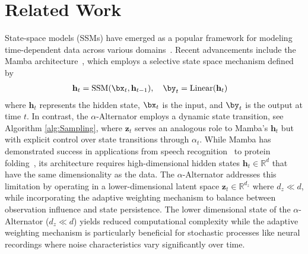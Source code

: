 \section{Related Work}
\label{sec:related}

 State-space models (SSMs) have emerged as a popular framework for modeling time-dependent data across various domains~\citep{gu2023mamba, rezaei2022direct,rezaei2021real,auger2021guide,rangapuram2018deep}. Recent advancements include the Mamba architecture~\citep{gu2023mamba}, which employs a selective state space mechanism defined by 
\begin{align*}
    \mathbf{h}_t &= \text{SSM}(\bx_t, \mathbf{h}_{t-1}), \quad \by_t = \text{Linear}(\mathbf{h}_t)
\end{align*}
where $\mathbf{h}_t$ represents the hidden state, $\bx_t$ is the input, and $\by_t$ is the output at time $t$. In contrast, the $\alpha$-Alternator employs a dynamic state transition, see Algorithm \ref{alg:Sampling}, where $\mathbf{z}_t$ serves an analogous role to Mamba's $\mathbf{h}_t$ but with explicit control over state transitions through $\alpha_t$. While Mamba has demonstrated success in applications from speech recognition~\citep{zhang2024mamba} to protein folding~\citep{xu2024protein}, its architecture requires high-dimensional hidden states $\mathbf{h}_t \in \mathbb{R}^d$ that have the same dimensionality as the data. The $\alpha$-Alternator addresses this limitation by operating in a lower-dimensional latent space $\mathbf{z}_t \in \mathbb{R}^{d_z}$ where $d_z \ll d$, while incorporating the adaptive weighting mechanism to balance between observation influence and state persistence. The lower dimensional state of the $\alpha$-Alternator ($d_z \ll d$) yields reduced computational complexity while the adaptive weighting mechanism is particularly beneficial for stochastic processes like neural recordings where noise characteristics vary significantly over time.

